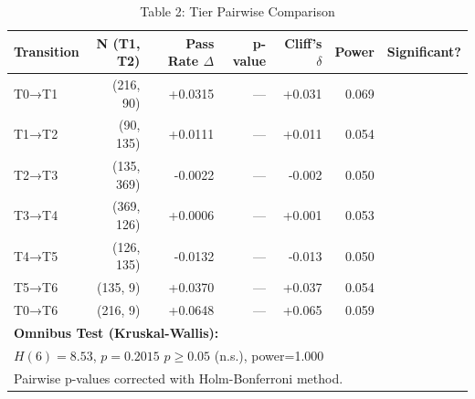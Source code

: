 \begin{table}[htbp]
\centering
\caption{Table 2: Tier Pairwise Comparison}
\label{tab:tier_comparison}
\begin{tabular}{lrrrrrl}
\toprule
Transition & N (T1, T2) & Pass Rate $\Delta$ & p-value & Cliff's $\delta$ & Power & Significant? \\
\midrule
T0→T1 & (216, 90) & +0.0315 & --- & +0.031 & 0.069 &  \\
T1→T2 & (90, 135) & +0.0111 & --- & +0.011 & 0.054 &  \\
T2→T3 & (135, 369) & -0.0022 & --- & -0.002 & 0.050 &  \\
T3→T4 & (369, 126) & +0.0006 & --- & +0.001 & 0.053 &  \\
T4→T5 & (126, 135) & -0.0132 & --- & -0.013 & 0.050 &  \\
T5→T6 & (135, 9) & +0.0370 & --- & +0.037 & 0.054 &  \\
T0→T6 & (216, 9) & +0.0648 & --- & +0.065 & 0.059 &  \\
\midrule
\multicolumn{7}{l}{\textbf{Omnibus Test (Kruskal-Wallis):}} \\
\multicolumn{7}{l}{$H(6)=8.53$, $p=0.2015$ $p \geq 0.05$ (n.s.), power=1.000} \\
\multicolumn{7}{l}{\footnotesize Pairwise p-values corrected with Holm-Bonferroni method.} \\
\bottomrule
\end{tabular}
\end{table}
